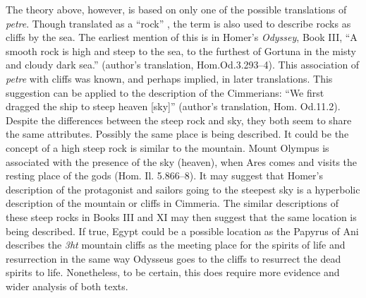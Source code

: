 	The theory above, however, is based on only one of the possible translations of \emph{petre}. Though translated as a “rock” \parencite{Liddell1940}, the term is also used to describe rocks as cliffs by the sea. The earliest mention of this is in Homer’s \emph{Odyssey}, Book III, “A smooth rock is high and steep to the sea, to the furthest of Gortuna in the misty and cloudy dark sea.” (author’s translation, Hom.Od.3.293–4). This association of \emph{petre} with cliffs was known, and perhaps implied, in later translations. This suggestion can be applied to the description of the Cimmerians: “We first dragged the ship to steep heaven [sky]” (author’s translation, Hom. Od.11.2). Despite the differences between the steep rock and sky, they both seem to share the same attributes. Possibly the same place is being described. It could be the concept of a high steep rock is similar to the mountain. Mount Olympus is associated with the presence of the sky (heaven), when Ares comes and visits the resting place of the gods (Hom. Il. 5.866–8). It may suggest that Homer’s description of the protagonist and sailors going to the steepest sky is a hyperbolic description of the mountain or cliffs in Cimmeria. The similar descriptions of these steep rocks in Books III and XI may then suggest that the same location is being described. If true, Egypt could be a possible location as the Papyrus of Ani describes the \emph{3ht} mountain cliffs as the meeting place for the spirits of life and resurrection in the same way Odysseus goes to the cliffs to resurrect the dead spirits to life. Nonetheless, to be certain, this does require more evidence and wider analysis of both texts.
	
